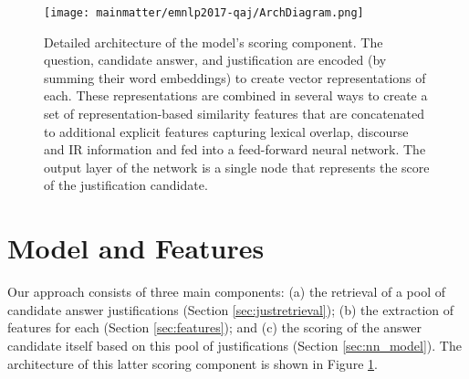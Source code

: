 
\begin{figure}[t]
\begin{center}
\texttt{[image: mainmatter/emnlp2017-qaj/ArchDiagram.png]}
\caption{ Detailed architecture of the model's scoring component.  
The question, candidate answer, and justification %
 are encoded (by summing their word embeddings) to create vector representations of each. These representations are combined in several ways to create a set of representation-based similarity features that are concatenated to additional explicit features capturing lexical overlap, discourse and IR information and fed into a feed-forward neural network.  The output layer of the network is a single node that represents the score of the justification candidate.}  %
\label{fig:arch}
\vspace{-5mm}
\end{center}
\end{figure}


\section{Model and Features}
\label{sec:pipeline}
Our approach consists of three main components: (a) the retrieval of a pool of candidate answer justifications (Section \ref{sec:justretrieval}); (b) the extraction of features for each (Section \ref{sec:features}); and (c) the scoring of the answer candidate itself based on this pool of justifications (Section \ref{sec:nn_model}).  The architecture of this latter scoring component is shown in Figure \ref{fig:arch}. 


